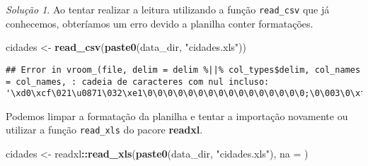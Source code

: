 \documentclass[
]{latex/krantz}
\newenvironment{Shaded}{\begin{snugshade}}{\end{snugshade}}
\newcommand{\AttributeTok}[1]{\textcolor[rgb]{0.13,0.29,0.53}{#1}}
\newcommand{\FunctionTok}[1]{\textcolor[rgb]{0.13,0.29,0.53}{\textbf{#1}}}
\newcommand{\NormalTok}[1]{#1}
\newcommand{\OtherTok}[1]{\textcolor[rgb]{0.56,0.35,0.01}{#1}}
\newcommand{\SpecialCharTok}[1]{\textcolor[rgb]{0.81,0.36,0.00}{\textbf{#1}}}
\newcommand{\StringTok}[1]{\textcolor[rgb]{0.31,0.60,0.02}{#1}}
\theoremstyle{definition}
\theoremstyle{definition}
\theoremstyle{definition}
\theoremstyle{definition}
\theoremstyle{remark}
\newtheorem*{solution}{Solução}
\begin{document}
\begin{solution}

Ao tentar realizar a leitura utilizando a função \texttt{read\_csv} que já conhecemos, obteríamos um erro devido a planilha conter formatações.

\begin{Shaded}
\begin{Highlighting}[]
\NormalTok{cidades }\OtherTok{\textless{}{-}} \FunctionTok{read\_csv}\NormalTok{(}\FunctionTok{paste0}\NormalTok{(data\_dir, }\StringTok{"cidades.xls"}\NormalTok{))}
\end{Highlighting}
\end{Shaded}

\begin{verbatim}
## Error in vroom_(file, delim = delim %||% col_types$delim, col_names = col_names, : cadeia de caracteres com nul incluso: '\xd0\xcf\021\u0871\032\xe1\0\0\0\0\0\0\0\0\0\0\0\0\0\0\0\0;\0\003\0\xfe\xff\t\0\006\0\0\0\0\0\0\0\0\0\0\0\f\0\0\0\x86\005\0\0\0\0\0\0\0\020\0\0\x83\005\0\0\001\0\0\0\xfe\xff\xff\xff\0\0\0\0\0\0\0\0\x80\0\0\0\x81\0\0\0\x82\0\0\0\x83\0\0\0\x84\0\0\0\x85\0\0\0\x86\0\0\0\x87\0\0\0\x88\0\0\0\x89\0\0\0\x8a\0\0\0\xff\xff\xff\xff\xff\xff\xff\xff\xff\xff\xff\xff\xff\xff\xff\xff\xff\xff\xff\xff\xff\xff\xff\xff\xff\xff\xff\xff\xff\xff\xff\xff\xff\xff\xff\xff\xff\xff\xff\xff\xff\xff\xff\xff\xff\xff\xff\xff\xff\xff\xff\xff\xff\xff\xff\xff\xff\xff\xff\xff\xff\xff\xff\xff\xff\xff\xff\xff\xff\xff\xff\xff\xff\xff\xff\xff\xff\xff\xff\xff\xff\xff\xff\xff\xff\xff\xff\xff\xff\xff\xff\xff\xff\xff\xff\xff\xff\xff\xff\xff\xff\xff\xff\xff\xff\xff\xff\xff\xff\xff\xff\xff\xff\xff\xff\xff\xff\xff\xff\xff\xff\xff\xff\xff\xff\xff\xff\xff\xff\xff\xff\xff\xff\xff\xff\xff\xff\xff\xff\xff\xff\xff\xff\xff\xff\xff\xff\xff\xff\xff\xff\xff\xff\xff\xff\xff\xff\xff\xff\xff\xff\xff\xff\
\end{verbatim}

Podemos limpar a formatação da planilha e tentar a importação novamente ou utilizar a função \texttt{read\_xls} do pacore \textbf{readxl}.

\begin{Shaded}
\begin{Highlighting}[]
\NormalTok{cidades }\OtherTok{\textless{}{-}}\NormalTok{ readxl}\SpecialCharTok{::}\FunctionTok{read\_xls}\NormalTok{(}\FunctionTok{paste0}\NormalTok{(data\_dir, }\StringTok{"cidades.xls"}\NormalTok{), }\AttributeTok{na =} \StringTok{\textquotesingle{}{-}\textquotesingle{}}\NormalTok{)}
\end{Highlighting}
\end{Shaded}


\end{solution}
\end{document}
